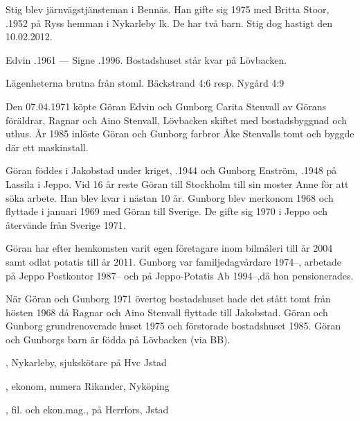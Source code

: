 Stig blev järnvägstjänsteman i Bennäs. Han gifte sig 1975 med Britta Stoor, .1952 på Ryss hemman i Nykarleby lk. De har två barn. Stig dog hastigt den 10.02.2012.

Edvin .1961  ---  Signe .1996. Bostadshuset står kvar på Lövbacken.




Lägenheterna brutna från stoml. Bäckstrand 4:6 resp. Nygård 4:9



Den 07.04.1971 köpte Göran Edvin och Gunborg Carita Stenvall av Görans föräldrar, Ragnar och Aino Stenvall,  Lövbacken skiftet med bostadsbyggnad och uthus. År 1985 inlöste Göran och Gunborg farbror Åke Stenvalls tomt och byggde där ett maskinstall.

Göran föddes i Jakobstad under kriget, .1944 och Gunborg Enström, .1948 på Lassila i Jeppo. Vid 16 år reste Göran till Stockholm till sin moster Anne för att söka arbete. Han blev kvar i nästan 10 år. Gunborg blev merkonom 1968 och flyttade i januari 1969 med Göran till Sverige. De gifte sig 1970 i Jeppo och återvände från Sverige 1971.

Göran har efter hemkomsten varit egen företagare inom bilmåleri till år 2004 samt odlat potatis till år 2011. Gunborg var familjedagvårdare 1974--, arbetade på Jeppo Postkontor 1987-- och på Jeppo-Potatis Ab 1994--,då hon pensionerades.

När Göran och Gunborg 1971 övertog bostadshuset hade det stått tomt från hösten 1968 då Ragnar och Aino Stenvall flyttade till Jakobstad. Göran och Gunborg grundrenoverade huset 1975 och förstorade bostadshuset 1985.
Göran och Gunborgs barn är födda på Lövbacken (via BB).
\begin{jhchildren}
  \item {}, Nykarleby, sjukskötare på Hvc Jstad
  \item {}, ekonom, numera Rikander, Nyköping
  \item {}, fil. och ekon.mag., på Herrfors, Jstad
\end{jhchildren}


